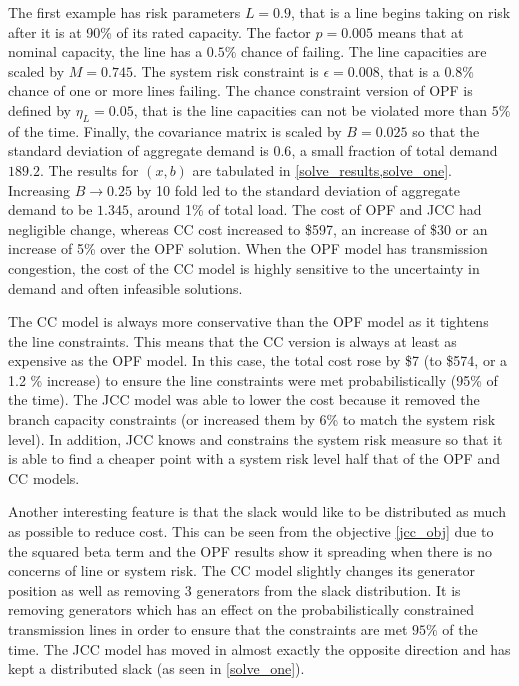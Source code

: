 The first example has risk parameters $L=0.9$, that is a line  begins taking on risk after it is at 90\% of its rated capacity.  The factor $p=0.005$ means that at nominal capacity, the line has a $0.5\%$ chance of failing.  The line capacities are scaled by $M=0.745$. The system risk constraint is $\epsilon=0.008$, that is a $0.8\%$ chance of one or more lines failing.  The chance constraint version of OPF is defined by $\eta_L=0.05$, that is the line capacities can not be violated more than $5\%$ of the time.  Finally, the covariance matrix is scaled by $B=0.025$ so that the standard deviation of aggregate demand is $0.6$, a small fraction of total demand $189.2$.  The results for $(x,b)$ are tabulated in \cref{solve_results,solve_one}.  Increasing $B\rightarrow 0.25$ by 10 fold led to the standard deviation of aggregate demand to be $1.345$, around 1\% of total load.  The cost of OPF and JCC had negligible change, whereas CC cost increased to \$597, an increase of \$30 or an increase of 5\% over the OPF solution. When the OPF model has transmission congestion, the cost of the CC model is highly sensitive to the uncertainty in demand  and  often infeasible solutions.



The CC model is always more conservative than the OPF model as it tightens the line constraints.  This means that the CC version is always at least as expensive as the OPF model.  In this case, the total cost rose by \$7 (to \$574, or a 1.2 \% increase) to ensure the line constraints were met probabilistically (95\% of the time).  The JCC model was able to lower the cost because it removed the branch capacity constraints (or increased them by 6\% to match the system risk level).  In addition, JCC knows and constrains the system risk measure so that it is able to find a cheaper point with a system risk level half that of the OPF and CC models.



Another interesting feature is that the slack would like to be distributed as much as possible to reduce cost.  This can be seen from the objective \ref{jcc_obj} due to the squared beta term and the OPF results show it spreading when there is no concerns of line or system risk.  The CC model slightly changes its generator position as well as removing 3 generators from the slack distribution.  It is removing generators which has an effect on the probabilistically constrained transmission lines in order to ensure that the constraints are met $95\%$ of the time.  The JCC model has moved in almost exactly the opposite direction and has kept a distributed slack (as seen in \cref{solve_one}).




